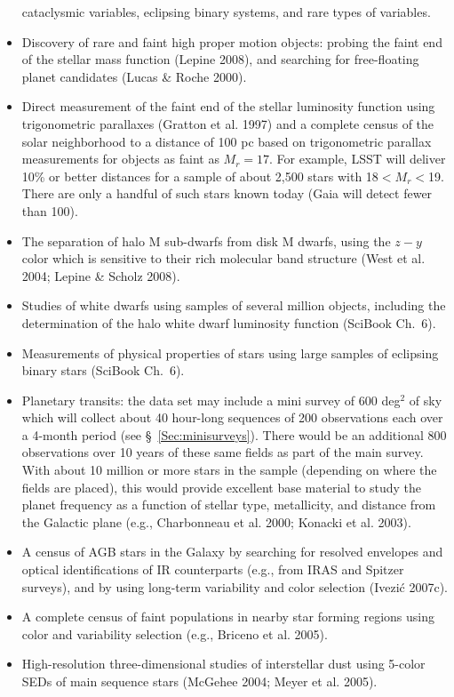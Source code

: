 \documentclass{emulateapj}
\newcommand{\B}[1]{{#1}}
\begin{document}
\begin{itemize}
      cataclysmic variables, eclipsing binary systems, and rare types of variables.
\item Discovery of rare and faint high proper motion objects: probing the
      faint end of the stellar mass function (Lepine 2008), and searching for 
      free-floating planet candidates (Lucas \& Roche 2000).
\item Direct measurement of the faint end of the stellar luminosity function 
      using trigonometric parallaxes (Gratton et al. 1997) and a complete census of the 
      solar neighborhood to a distance of 100 pc based on trigonometric parallax measurements 
      for objects as faint as $M_r=17$. For example, LSST will deliver 10\% or
      better distances for a sample of about 2,500 stars with
      18$<M_r<$19. There are only a handful of such stars known today 
      (Gaia will detect fewer than 100). 
\item The separation of halo M sub-dwarfs from disk M dwarfs, using 
      the $z-y$ color which is sensitive to their rich molecular band structure
      (West et al. 2004; Lepine \& Scholz 2008).
\item \B{Studies of white dwarfs using samples of several million objects, 
    including the determination of the halo white dwarf luminosity function  
     (SciBook Ch.~6). }
\item \B{Measurements of physical properties of stars using large samples  
        of eclipsing binary stars (SciBook Ch.~6). }
\item Planetary transits: the data set may include a mini survey of 600
      deg$^2$ of sky which will collect about 40 hour-long sequences of 200 
      observations each over a 4-month period (see \S~\ref{Sec:minisurveys}). 
      There would be an additional 800 observations over 10 years of these
      same fields as part of the main survey. With about 10 million or more stars 
      in the sample (depending on where the fields are placed), this would
      provide excellent base material to study the planet frequency as a
      function of stellar type, metallicity, and distance from the Galactic plane
      (e.g., Charbonneau et al. 2000; Konacki et al. 2003).
\item A census of AGB stars in the Galaxy by searching for 
      resolved envelopes and optical identifications of IR counterparts (e.g., from 
      IRAS and Spitzer surveys), and by using long-term variability and color 
      selection (Ivezi\'{c} 2007c).
\item A complete census of faint populations in nearby star forming regions using 
      color and variability selection (e.g., Briceno et al. 2005). 
\item High-resolution three-dimensional studies of interstellar dust using 5-color 
      SEDs of main sequence stars (McGehee 2004; Meyer et al. 2005). 
\end{itemize} 
\end{document}
